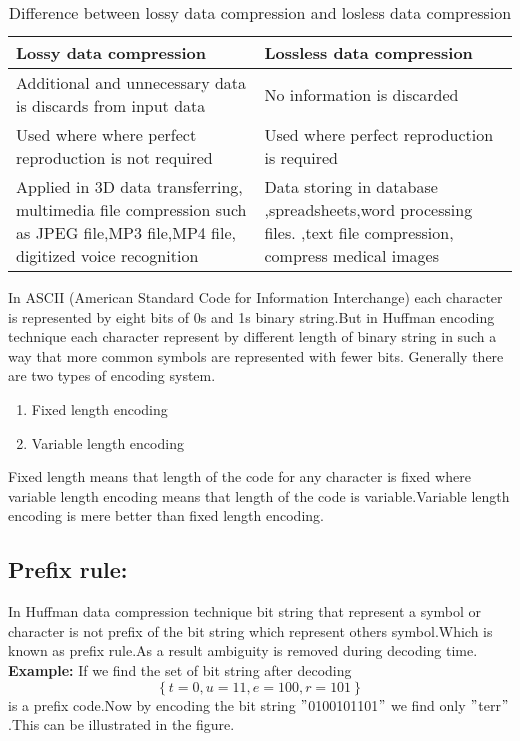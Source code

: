 \documentclass[conference]{IEEEtran}
\begin{document}
\begin{table}[h!]
   
        
    
\caption{Difference between lossy data compression and losless data compression} 
  \label{table:lossy}
  \begin{tabu} to 0.5 \textwidth  {|X[l]|X[l]|}
  \hline
      Lossy data compression & 
       Lossless data compression\\
       \hline
       Additional and unnecessary
       data is discards from input data\textsc{\cite{nelson1995data}}
       & No information is discarded\textsc{\cite{nelson1995data}}\\
       \hline
       Used where where perfect reproduction is not required\textsc{\cite{ng1997lossless}} & Used where perfect reproduction is required\textsc{\cite{ng1997lossless}}\\
       \hline
       Applied in 3D data transferring, multimedia file compression such as JPEG file,MP3 file,MP4 file, digitized voice recognition\textsc{\cite{nelson1995data,ng1997lossless}} & Data storing in database ,spreadsheets,word processing files. ,text file compression, compress medical images\textsc{\cite{nelson1995data,ng1997lossless}}\\
       \hline
      
  \end{tabu}
  
    
\end{table}
In ASCII (American Standard Code for Information Interchange)  each character is represented by eight bits of 0s and 1s binary string.But in Huffman encoding technique each character represent by different length of binary string in such a way that more common symbols are represented with fewer bits.\textsc{\cite{han2015deep}}
Generally there are two types of encoding system.
\begin{enumerate}
\label{list:into2}
  \item Fixed length encoding 
  \item Variable length encoding
\end{enumerate}
Fixed length means that length of the code for any character is fixed where variable length encoding means that length of the code is variable.Variable length encoding is mere better than fixed length encoding.\textsc{\cite{cormen2009introduction}}

\subsection{\textbf{Prefix rule:}}
In Huffman data compression technique bit string that represent a symbol or character is not prefix of the bit string which represent others symbol\textsc{\cite{cormen2009introduction}}.Which is known as prefix rule.As a result  ambiguity is removed during decoding time. \\
\textbf{Example:} If we find the set of bit string after decoding \[ \left \{t=0,u=11,e=100,r=101 \right\} \] is a prefix code.Now by encoding the bit string $"$0100101101$"$ we find only $"$terr$"$.This can be illustrated in the figure.
\end{document}
